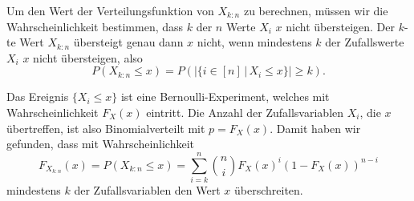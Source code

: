 Um den Wert der Verteilungsfunktion von $X_{k:n}$ zu berechnen, müssen wir 
die Wahrscheinlichkeit bestimmen, dass $k$ der $n$ Werte $X_i$ $x$ nicht
übersteigen.
Der $k$-te Wert $X_{k:n}$ übersteigt genau dann $x$ nicht, wenn
mindestens $k$ der Zufallswerte $X_i$ $x$ nicht übersteigen, also
\[
P(X_{k:n} \le x)
=
P\left(
|\{i\in[n]\,|\, X_i\le x\}| \ge k
\right).
\]

Das Ereignis $\{X_i\le x\}$ ist eine Bernoulli-Experiment, welches mit
Wahrscheinlichkeit $F_X(x)$ eintritt.
Die Anzahl der Zufallsvariablen $X_i$, die $x$ übertreffen, ist also
Binomialverteilt mit $p=F_X(x)$.
Damit haben wir gefunden, dass mit Wahrscheinlichkeit
\begin{equation}
F_{X_{k:n}}(x)
=
P(X_{k:n}\le x)
=
\sum_{i=k}^n \binom{n}{i}F_X(x)^i (1-F_X(x))^{n-i}
\label{dreieck:eqn:FXkn}
\end{equation}
mindestens $k$ der Zufallsvariablen den Wert $x$ überschreiten.

